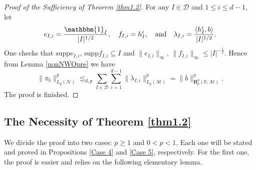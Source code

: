 \documentclass[oneside,english,a4wide]{amsart}
\numberwithin{equation}{section}
\numberwithin{figure}{section}
\theoremstyle{plain}
\theoremstyle{plain}
\theoremstyle{definition}
\theoremstyle{plain}
\theoremstyle{remark}
\theoremstyle{definition}
\theoremstyle{remark}
\theoremstyle{definition}
\newcommand{\M}{{\mathcal M}}
\newcommand{\8}{\infty}
\begin{document}
	

	





\begin{proof}[Proof of the Sufficiency of Theorem \ref{thm1.2}]
	For any $I\in\mathcal{D}$ and $1\le i\le d-1$, let 
	\begin{equation*}
		e_{I,i}=\frac{\mathbbm{1}_{I}}{|I|^{1/2}},\quad f_{I,i}=h_I^i,\quad \text{and}\quad \lambda_{I,i}=\frac{\langle h_I^i,b\rangle}{|I|^{1/2}}.
	\end{equation*}
One checks that $\mathrm{supp}e_{I,i}, \,\mathrm{supp}f_{I,i}\subseteq I$ and
$\|e_{I,i}\|_{\infty},\,\|f_{I,i}\|_{\infty}\le |I|^{-\frac{1}{2}}$. Hence from Lemma \ref{nonNWOpre} we have
\begin{equation*}
	\|\pi_b\|^p_{L_p(\mathcal{N})}\lesssim_{d,p}	\sum_{I\in\mathcal{D}}\sum_{i=1}^{d-1}\|\lambda_{I,i}\|^p_{L_p(\mathcal{M})}=\|b\|^p_{\pmb{B}_p^d(\mathbb{R},\M)}.
\end{equation*}
The proof is finished.
\end{proof}



\subsection{The Necessity of Theorem \ref{thm1.2}}\label{Proof of the Sufficiency of theorem 1.2}
We divide the proof into two cases: $p\ge 1$ and $0<p<1$. Each one will be stated and proved in Propositions \ref{Case 4} and \ref{Case 5}, respectively. For the first one, the proof is easier and relies on the following elementary lemma.
\end{document}
